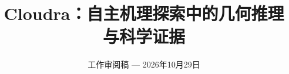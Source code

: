 \documentclass[10pt,twocolumn,a4paper]{article}
\title{Cloudra：自主机理探索中的几何推理与科学证据}
\author{}
\date{\small 工作审阅稿 --- 2026年10月29日}
\makeatletter
\numberwithin{equation}{section}
\renewcommand{\maketitle}{%
  \twocolumn[{\centering
    {\LARGE\bfseries\@title\par}\vspace{0.6em}
    {\small\@date\par}\vspace{1.2em}}]%
}
\makeatother
\begin{document}
\maketitle
\nocite{ref01,ref02,ref03,ref04,ref05,ref06,ref07,ref08,ref09,ref10,ref11,ref12,ref13,ref14,ref15,ref16,ref17,ref18}



\balance


\end{document}
